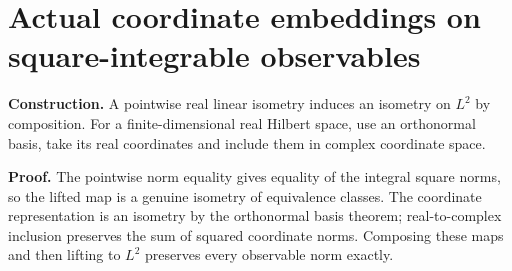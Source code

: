 \documentclass[11pt,a4paper]{article}
\begin{document}
\section{\texorpdfstring{Actual coordinate embeddings on square-integrable observables}{Actual coordinate embeddings on square-integrable observables}}


\textbf{Construction.} A pointwise real linear isometry induces an isometry on \(L^2\) by composition. For a finite-dimensional real Hilbert space, use an orthonormal basis, take its real coordinates and include them in complex coordinate space.



\textbf{Proof.} The pointwise norm equality gives equality of the integral square norms, so the lifted map is a genuine isometry of equivalence classes. The coordinate representation is an isometry by the orthonormal basis theorem; real-to-complex inclusion preserves the sum of squared coordinate norms. Composing these maps and then lifting to \(L^2\) preserves every observable norm exactly.
\end{document}
